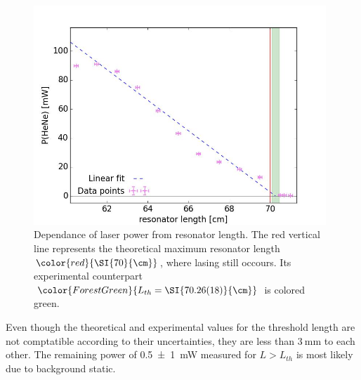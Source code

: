 \documentclass[../main.tex]{subfiles}
\begin{document}
    \begin{figure}[H]
        \centering
        \includegraphics[width = 11cm]{Bilddateien/4/4-Laserleistung-Resonatorlaenge.jpg}
        \caption{Dependance of laser power from resonator length. The red vertical line represents the theoretical maximum resonator length $\color{red}{\SI{70}{\cm}}$, where lasing still occours. Its experimental counterpart $\color{ForestGreen}{L_{th} = \SI{70.26(18)}{\cm}}$  is colored green.}
        \label{fig:4-Laserleistung-Resonatorlaenge}
    \end{figure}

    \noindent Even though the theoretical and experimental values for the threshold length are not comptatible according to their uncertainties, they are less than $\SI{3}{\mm}$ to each other. The remaining power of \SI{0.5(10)}{\mW} measured for $L > L_{th}$ is most likely due to background static.
\end{document}
